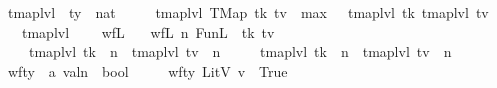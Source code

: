 \documentclass[11pt]{article}
\begin{document}
\begin{isabellebody}
\isanewline
{}\isamarkupfalse%
\ tmap{\isacharunderscore}{\kern0pt}lvl\ {\isacharcolon}{\kern0pt}{\isacharcolon}{\kern0pt}\ {\isachardoublequoteopen}ty\ {\isasymRightarrow}\ nat{\isachardoublequoteclose}\ \isanewline
\ \ \ \ {\isachardoublequoteopen}tmap{\isacharunderscore}{\kern0pt}lvl\ {\isacharparenleft}{\kern0pt}TMap\ tk\ tv{\isacharparenright}{\kern0pt}\ {\isacharequal}{\kern0pt}\ max\ {\isacharparenleft}{\kern0pt}{}\ {\isacharplus}{\kern0pt}\ tmap{\isacharunderscore}{\kern0pt}lvl\ tk{\isacharparenright}{\kern0pt}\ {\isacharparenleft}{\kern0pt}tmap{\isacharunderscore}{\kern0pt}lvl\ tv{\isacharparenright}{\kern0pt}{\isachardoublequoteclose}\isanewline
\ \ {\isacharbar}{\kern0pt}\ {\isachardoublequoteopen}tmap{\isacharunderscore}{\kern0pt}lvl\ {\isacharunderscore}{\kern0pt}\ {\isacharequal}{\kern0pt}\ {}{\isachardoublequoteclose}\isanewline
\isanewline
{}\isamarkupfalse%
\ wf{\isacharunderscore}{\kern0pt}L\ \isanewline
\ \ {\isachardoublequoteopen}wf{\isacharunderscore}{\kern0pt}L\ n\ {\isacharparenleft}{\kern0pt}FunL\ {\isacharunderscore}{\kern0pt}\ tk\ tv{\isacharparenright}{\kern0pt}\ {\isacharequal}{\kern0pt}\ {\isacharparenleft}{\kern0pt}\isanewline
\ \ \ \ {\isacharparenleft}{\kern0pt}tmap{\isacharunderscore}{\kern0pt}lvl\ tk\ {\isasymle}\ n{\isacharminus}{\kern0pt}{}{\isacharparenright}{\kern0pt}\ {\isasymand}\ {\isacharparenleft}{\kern0pt}tmap{\isacharunderscore}{\kern0pt}lvl\ tv\ {\isasymle}\ n{\isacharparenright}{\kern0pt}\ {\isasymand}\isanewline
\ \ \ \ {\isacharparenleft}{\kern0pt}{\isacharparenleft}{\kern0pt}tmap{\isacharunderscore}{\kern0pt}lvl\ tk\ {\isacharequal}{\kern0pt}\ n{\isacharminus}{\kern0pt}{}{\isacharparenright}{\kern0pt}\ {\isasymor}\ {\isacharparenleft}{\kern0pt}tmap{\isacharunderscore}{\kern0pt}lvl\ tv\ {\isacharequal}{\kern0pt}\ n{\isacharparenright}{\kern0pt}{\isacharparenright}{\kern0pt}{\isacharparenright}{\kern0pt}{\isachardoublequoteclose}\ \ \isanewline
\isanewline
{}\isamarkupfalse%
\ wf{\isacharunderscore}{\kern0pt}ty\ {\isacharcolon}{\kern0pt}{\isacharcolon}{\kern0pt}\ {\isachardoublequoteopen}{\isacharprime}{\kern0pt}a\ valn\ {\isasymRightarrow}\ bool{\isachardoublequoteclose}\ \isanewline
\ \ \ \ {\isachardoublequoteopen}wf{\isacharunderscore}{\kern0pt}ty\ {\isacharparenleft}{\kern0pt}LitV\ v{\isacharparenright}{\kern0pt}\ {\isacharequal}{\kern0pt}\ True{\isachardoublequoteclose}\isanewline

\end{isabellebody}
\end{document}
